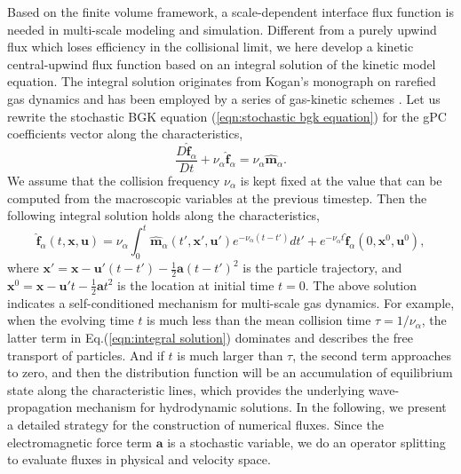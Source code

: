 \documentclass[preprint,3p,12pt,sort&compress]{elsarticle}
\begin{document}
Based on the finite volume framework, a scale-dependent interface flux function is needed in multi-scale modeling and simulation.
Different from a purely upwind flux which loses efficiency in the collisional limit, we here develop a kinetic central-upwind flux function based on an integral solution of the kinetic model equation.
The integral solution originates from Kogan's monograph on rarefied gas dynamics \cite{koganrarefied} and has been employed by a series of gas-kinetic schemes \cite{xu2010unified,xiao2017well,liu2017unified,xiao2019unified, xiao2020velocity}.
Let us rewrite the stochastic BGK equation (\ref{eqn:stochastic bgk equation}) for the gPC coefficients vector along the characteristics,
\begin{equation}
\frac{D \hat {\boldsymbol f}_\alpha}{D t} + \nu_\alpha \hat {\boldsymbol f}_\alpha = \nu_\alpha \hat {\boldsymbol m}_\alpha.
\end{equation}
We assume that the collision frequency $\nu_\alpha$ is kept fixed at the value that can be computed from the macroscopic variables at the previous timestep.
Then the following integral solution holds along the characteristics,
\begin{equation}
\hat{\boldsymbol f}_\alpha(t,\mathbf x,\mathbf u)=\nu_\alpha \int_{0}^t \hat{ \boldsymbol m}_\alpha(t',\mathbf x',\mathbf u')e^{-\nu_\alpha(t-t')}dt' +e^{-\nu_\alpha t} \hat {\boldsymbol f}_\alpha(0,\mathbf x^0,\mathbf u^0),
\label{eqn:integral solution}
\end{equation}
where $\mathbf x'=\mathbf x-\mathbf u'(t-t')-\frac{1}{2}\mathbf a (t-t')^2$ is the particle trajectory, and $\mathbf x^0=\mathbf x-\mathbf u't-\frac{1}{2} \mathbf a t^2$ is the location at initial time $t=0$. The above solution indicates a self-conditioned mechanism for multi-scale gas dynamics.
For example, when the evolving time $t$ is much less than the mean collision time $\tau=1/\nu_\alpha$, the latter term in Eq.(\ref{eqn:integral solution}) dominates and describes the free transport of particles.
And if $t$ is much larger than $\tau$, the second term approaches to zero, and then the distribution function will be an accumulation of equilibrium state along the characteristic lines, which provides the underlying wave-propagation mechanism for hydrodynamic solutions.
In the following, we present a detailed strategy for the construction of  numerical fluxes.
Since the electromagnetic force term $\mathbf a$ is a stochastic variable, we do an operator splitting to evaluate fluxes in physical and velocity space.
\end{document}
